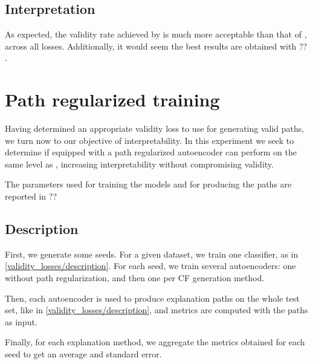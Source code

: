 \documentclass[../main.tex]{subfiles}
\begin{document}
\subsection{Interpretation}

As expected, the validity rate achieved by \revise{} is much more acceptable than that of \ls{}, across all losses.
Additionally, it would seem the best results are obtained with ?? .

\section{Path regularized training}
\label{exp/path_reg}

Having determined an appropriate validity loss to use for generating valid paths, we turn now to our objective of interpretability.
In this experiment we seek to determine if \ls{} equipped with a path regularized autoencoder can perform on the same level as \revise{}, increasing interpretability without compromising validity.




The parameters used for training the models and for producing the paths are reported in ?? 

\subsection{Description}

First, we generate some seeds.
For a given dataset, we train one classifier, as in \autoref{validity_losses/description}.
For each seed, we train several autoencoders: one without path regularization, and then one per CF generation method.

Then, each autoencoder is used to produce explanation paths on the whole test set, like in \autoref{validity_losses/description}, and metrics are computed with the paths as input.

Finally, for each explanation method, we aggregate the metrics obtained for each seed to get an average and standard error.



\end{document}
